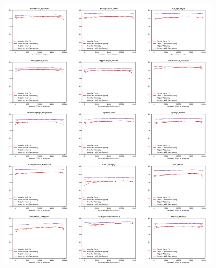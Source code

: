 \documentclass{article}
\begin{document}
\begin{figure}[!h]
\centerline{\includegraphics[width=\overlapscale\textwidth]{images/overlapping/montage_animals10}}
\end{figure}
\end{document}
